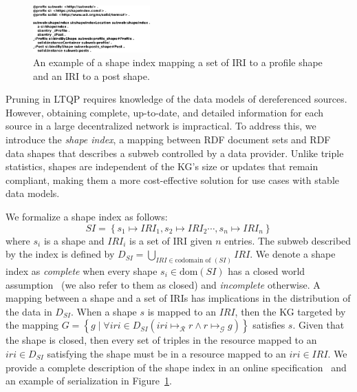 \begin{figure}
   \centering
   \includegraphics[width=0.4\textwidth]{figure/shapeIndex.pdf}

   \caption{An example of a shape index mapping a set of IRI to a profile shape and an IRI to a post shape.}
   \label{fig:shapeIndex}
\end{figure}

Pruning in LTQP requires knowledge of the data models of dereferenced sources.  
However, obtaining complete, up-to-date, and detailed information for each source in a large decentralized network is impractical.  
To address this, we introduce the \emph{shape index}, a mapping between RDF document sets and RDF data shapes that describes a subweb controlled by a data provider.  
Unlike triple statistics, shapes are independent of the KG's size or updates that remain compliant, making them a more cost-effective solution for use cases with stable data models. 

We formalize a shape index as follows:
\begin{equation}\label{eq:shapeIndex}
   SI = \left\{ s_1 \mapsto IRI_1, s_2 \mapsto IRI_2 \cdots, s_n \mapsto IRI_n \right\}
\end{equation}
where $s_i$ is a shape and $IRI_i$ is a set of IRI given $n$ entries.
The subweb described by the index is defined by $D_{SI} = \bigcup_{IRI \in \text{codomain of }(SI)} IRI$.
We denote a shape index as \emph{complete} when every shape $s_i \in \text{dom}(SI)$ has a closed world assumption~\cite{Gayo2018b, Gayo2018} (we also refer to them as closed) and \emph{incomplete} otherwise.
A mapping between a shape and a set of IRIs has implications in the distribution of the data in $D_{SI}$.
When a shape $s$ is mapped to an $IRI$, then the KG targeted by the mapping $G = \left\{ g \mid \forall iri \in D_{SI} (iri \mapsto_{\mathcal{R}} r \land r \mapsto_{\mathcal{G}} g) \right\}$ satisfies $s$.
Given that the shape is closed, then every set of triples in the resource mapped to an $iri \in D_{SI}$ satisfying the shape must be in a resource mapped to an $iri \in IRI$.
We provide a complete description of the shape index in an online specification~ and an example of serialization in Figure~\ref{fig:shapeIndex}.

